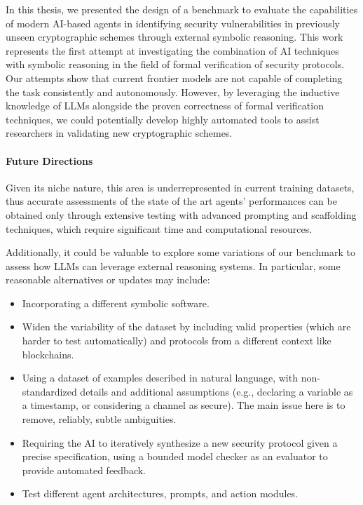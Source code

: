\documentclass[a4paper,12pt,twoside,openany]{book}
\begin{document}
In this thesis, we presented the design of a benchmark to evaluate the capabilities of modern AI-based agents in identifying security vulnerabilities in previously unseen cryptographic schemes through external symbolic reasoning. This work represents the first attempt at investigating the combination of AI techniques with symbolic reasoning in the field of formal verification of security protocols. Our attempts show that current frontier models are not capable of completing the task consistently and autonomously. However, by leveraging the inductive knowledge of LLMs alongside the proven correctness of formal verification techniques, we could potentially develop highly automated tools to assist researchers in validating new cryptographic schemes.

\paragraph{Future Directions}

Given its niche nature, this area is underrepresented in current training datasets, thus accurate assessments of the state of the art agents' performances can be obtained only through extensive testing with advanced prompting and scaffolding techniques, which require significant time and computational resources.

Additionally, it could be valuable to explore some variations of our benchmark to assess how LLMs can leverage external reasoning systems. In particular, some reasonable alternatives or updates may include:

\begin{itemize}
    \item Incorporating a different symbolic software.
    \item Widen the variability of the dataset by including valid properties (which are harder to test automatically) and protocols from a different context like blockchains.
    \item Using a dataset of examples described in natural language, with non-standardized details and additional assumptions (e.g., declaring a variable as a timestamp, or considering a channel as secure). The main issue here is to remove, reliably, subtle ambiguities.
    \item Requiring the AI to iteratively synthesize a new security protocol given a precise specification, using a bounded model checker as an evaluator to provide automated feedback.
    \item Test different agent architectures, prompts, and action modules.
\end{itemize}



\newpage
\appendix
\label{chap:appendix_a}



\end{document}
